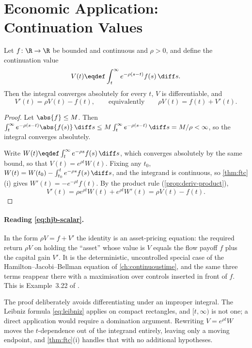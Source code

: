 \section{Economic Application: Continuation Values}\label{sec:int-continuation}

\begin{proposition}\label{prop:continuation-value}
	Let $f\colon\R\to\R$ be bounded and continuous and $\rho>0$, and define the
	continuation value
	\[
		V(t)\eqdef\int_t^{\infty}e^{-\rho(s-t)}f(s)\,\diff s .
	\]
	Then the integral converges absolutely for every $t$, $V$ is differentiable, and
	\begin{equation}\label{eq:hjb-scalar}
		V'(t)=\rho V(t)-f(t),
		\qquad\text{equivalently}\qquad
		\rho V(t)=f(t)+V'(t).
	\end{equation}
\end{proposition}

\begin{proof}
	Let $\abs{f}\leq M$. Then
	$\int_t^{\infty}e^{-\rho(s-t)}\abs{f(s)}\,\diff s\leq M\int_t^{\infty}e^{-\rho(s-t)}\,\diff s
		=M/\rho<\infty$, so the integral converges absolutely.

	Write $W(t)\eqdef\int_t^{\infty}e^{-\rho s}f(s)\,\diff s$, which converges absolutely
	by the same bound, so that $V(t)=e^{\rho t}W(t)$. Fixing any $t_0$,
	$W(t)=W(t_0)-\int_{t_0}^{t}e^{-\rho s}f(s)\,\diff s$, and the integrand is
	continuous, so \autoref{thm:ftc}(i) gives $W'(t)=-e^{-\rho t}f(t)$. By the
	product rule (\autoref{prop:deriv-product}),
	\[
		V'(t)=\rho e^{\rho t}W(t)+e^{\rho t}W'(t)=\rho V(t)-f(t).
	\]
\end{proof}

\paragraph{Reading \eqref{eq:hjb-scalar}.} In the form
$\rho V=f+V'$ the identity is an asset-pricing equation: the required return
$\rho V$ on holding the ``asset'' whose value is $V$ equals the flow payoff $f$
plus the capital gain $V'$. It is the deterministic, uncontrolled special case of
the Hamilton--Jacobi--Bellman equation of \autoref{ch:continuoustime}, and the
same three terms reappear there with a maximisation over controls inserted in
front of $f$. This is Example~3.22 of \textcite{fukuda2026notes}
\autocite[slide 94]{fukuda2026calculus}.

The proof deliberately avoids differentiating under an improper integral. The
Leibniz formula \eqref{eq:leibniz} applies on compact rectangles, and $[t,\infty)$
is not one; a direct application would require a domination argument. Rewriting
$V=e^{\rho t}W$ moves the $t$-dependence out of the integrand entirely, leaving
only a moving endpoint, and \autoref{thm:ftc}(i) handles that with no additional
hypotheses.

